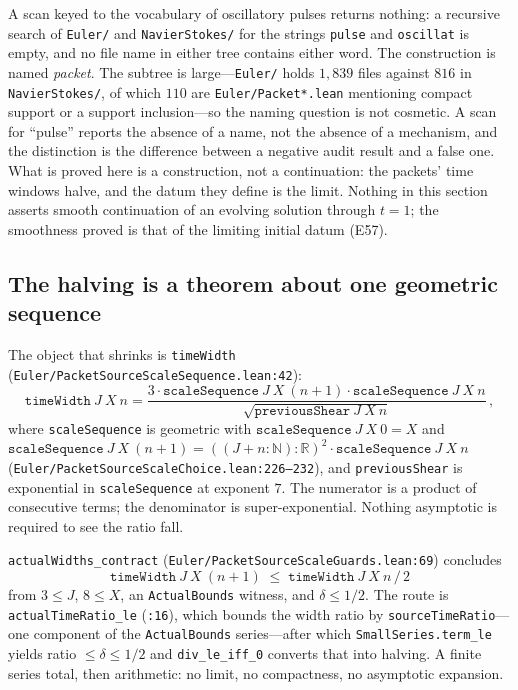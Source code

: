 \documentclass[11pt]{article}
\newcommand{\R}{\mathbb{R}}
\newcommand{\ct}[1]{\texttt{#1}}
\newcommand{\file}[1]{\texttt{\small #1}}
\theoremstyle{plain}
\theoremstyle{definition}
\theoremstyle{remark}
\begin{document}
A scan keyed to the vocabulary of oscillatory pulses returns nothing: a
recursive search of \file{Euler/} and \file{NavierStokes/} for the strings
\ct{pulse} and \ct{oscillat} is empty, and no file name in either tree contains
either word. The construction
is named \emph{packet}. The subtree is large---\file{Euler/} holds $1{,}839$
files against $816$ in \file{NavierStokes/}, of which $110$ are
\file{Euler/Packet*.lean} mentioning compact support or a support
inclusion---so the naming question is not cosmetic. A scan for ``pulse'' reports
the absence of a name, not the absence of a mechanism, and the distinction is
the difference between a negative audit result and a false one. What is proved
here is a construction, not a continuation: the packets' time windows halve, and
the datum they define is the limit. Nothing in this section asserts smooth
continuation of an evolving solution through $t=1$; the smoothness proved is
that of the limiting initial datum (E57).

\subsection{The halving is a theorem about one geometric sequence}

The object that shrinks is \ct{timeWidth} (\file{Euler/PacketSourceScaleSequence.lean:42}):
\begin{equation}
  \ct{timeWidth}\ J\ X\ n =
  \frac{3\cdot\ct{scaleSequence}\ J\ X\ (n+1)\cdot\ct{scaleSequence}\ J\ X\ n}
       {\sqrt{\ct{previousShear}\ J\ X\ n}}\,,
\end{equation}
where \ct{scaleSequence} is geometric with $\ct{scaleSequence}\ J\ X\ 0 = X$ and
$\ct{scaleSequence}\ J\ X\ (n+1) = ((J+n:\mathbb{N}):\R)^{2}\cdot\ct{scaleSequence}\ J\ X\ n$
(\file{Euler/PacketSourceScaleChoice.lean:226--232}), and \ct{previousShear} is
exponential in \ct{scaleSequence} at exponent $7$. The numerator is a product of
consecutive terms; the denominator is super-exponential. Nothing asymptotic is
required to see the ratio fall.

\ct{actualWidths\_contract} (\file{Euler/PacketSourceScaleGuards.lean:69})
concludes
\[
  \ct{timeWidth}\ J\ X\ (n+1)\;\le\;\ct{timeWidth}\ J\ X\ n\,/\,2
\]
from $3\le J$, $8\le X$, an \ct{ActualBounds} witness, and $\delta\le 1/2$. The
route is \ct{actualTimeRatio\_le} (\file{:16}), which bounds the width ratio by
\ct{sourceTimeRatio}---one component of the \ct{ActualBounds} series---after
which \ct{SmallSeries.term\_le} yields ratio $\le\delta\le 1/2$ and
\ct{div\_le\_iff\_0} converts that into halving. A finite series total, then
arithmetic: no limit, no compactness, no asymptotic expansion.
\end{document}
